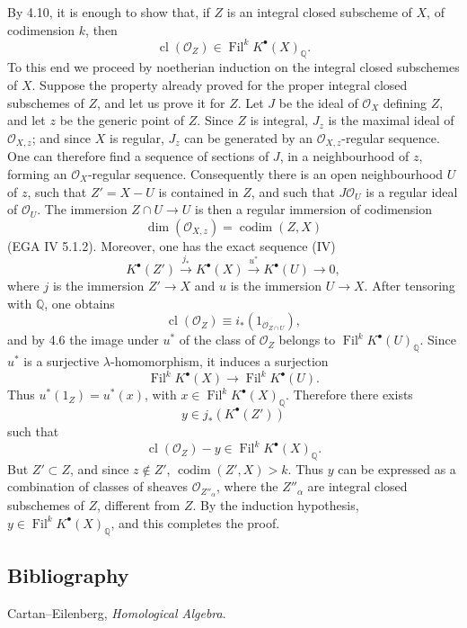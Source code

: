 \documentclass[11pt]{article}
\newcommand{\Fil}{\operatorname{Fil}}
\providecommand{\codim}{\operatorname{codim}}
\providecommand{\codim}{\operatorname{codim}}
\begin{document}
By 4.10, it is enough to show that, if \(Z\) is an integral closed subscheme of \(X\), of codimension \(k\), then
\[
  \operatorname{cl}(\mathcal O_Z)\in\Fil^kK^\bullet(X)_{\mathbb Q}.
\]
To this end we proceed by noetherian induction on the integral closed subschemes of \(X\). Suppose the property already proved for the proper integral closed subschemes of \(Z\), and let us prove it for \(Z\). Let \(J\) be the ideal of \(\mathcal O_X\) defining \(Z\), and let \(z\) be the generic point of \(Z\). Since \(Z\) is integral, \(J_z\) is the maximal ideal of \(\mathcal O_{X,z}\); and since \(X\) is regular, \(J_z\) can be generated by an \(\mathcal O_{X,z}\)-regular sequence. One can therefore find a sequence of sections of \(J\), in a neighbourhood of \(z\), forming an \(\mathcal O_X\)-regular sequence. Consequently there is an open neighbourhood \(U\) of \(z\), such that \(Z'=X-U\) is contained in \(Z\), and such that \(J\mathcal O_U\) is a regular ideal of \(\mathcal O_U\). The immersion \(Z\cap U\to U\) is then a regular immersion of codimension
\[
  \dim(\mathcal O_{X,z})=\codim(Z,X)
\]
(EGA IV 5.1.2). Moreover, one has the exact sequence (IV)
\[
  K^\bullet(Z')\xrightarrow{j_*}K^\bullet(X)
  \xrightarrow{u^*}K^\bullet(U)\to0,
\]
where \(j\) is the immersion \(Z'\to X\) and \(u\) is the immersion \(U\to X\). After tensoring with \(\mathbb Q\), one obtains
\[
  \operatorname{cl}(\mathcal O_Z)
  \equiv i_*(1_{\mathcal O_{Z\cap U}}),
\]
and by 4.6 the image under \(u^*\) of the class of \(\mathcal O_Z\) belongs to \(\Fil^kK^\bullet(U)_{\mathbb Q}\). Since \(u^*\) is a surjective \(\lambda\)-homomorphism, it induces a surjection
\[
  \Fil^kK^\bullet(X)\longrightarrow \Fil^kK^\bullet(U).
\]
Thus \(u^*(1_Z)=u^*(x)\), with \(x\in\Fil^kK^\bullet(X)_{\mathbb Q}\). Therefore there exists
\[
  y\in j_*(K^\bullet(Z'))
\]
such that
\[
  \operatorname{cl}(\mathcal O_Z)-y\in\Fil^kK^\bullet(X)_{\mathbb Q}.
\]
But \(Z'\subset Z\), and since \(z\notin Z'\), \(\codim(Z',X)>k\). Thus \(y\) can be expressed as a combination of classes of sheaves \(\mathcal O_{Z''_\alpha}\), where the \(Z''_\alpha\) are integral closed subschemes of \(Z\), different from \(Z\). By the induction hypothesis, \(y\in\Fil^kK^\bullet(X)_{\mathbb Q}\), and this completes the proof.

\subsection*{Bibliography}
\begin{enumerate}[label={[\arabic*]}]
\item Cartan--Eilenberg, \emph{Homological Algebra}.
\end{enumerate}
\end{document}
